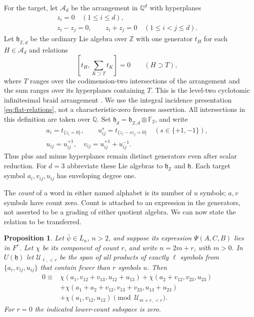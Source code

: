 \documentclass[11pt]{article}
\newcommand{\Q}{\mathbb Q}
\newcommand{\Z}{\mathbb Z}
\newcommand{\F}{{\mathbb F_2}}
\newtheorem{proposition}[theorem]{Proposition}
\theoremstyle{definition}
\theoremstyle{remark}
\numberwithin{equation}{section}
\begin{document}
For the target, let $\mathcal A_d$ be the arrangement in $\Q^d$ with
hyperplanes
\[
 \begin{gathered}
 z_i=0\quad(1\leq i\leq d),\\
 z_i-z_j=0,\qquad z_i+z_j=0\quad(1\leq i<j\leq d).
 \end{gathered}
\]
Let $\mathfrak h_{\Z,d}$ be the ordinary Lie algebra over $\Z$ with
one generator $t_H$ for each $H\in\mathcal A_d$ and relations
\begin{equation}\label{eq:flat-relations}
 \left[t_H,\sum_{K\supset T}t_K\right]=0
 \qquad(H\supset T),
\end{equation}
where $T$ ranges over the codimension-two intersections of the
arrangement and the sum ranges over its hyperplanes containing $T$.
This is the level-two cyclotomic infinitesimal braid arrangement
\cite[Section~1.4]{Enriquez}.  We use the integral incidence
presentation \eqref{eq:flat-relations}, not a characteristic-zero
freeness assertion.
All intersections in this definition are taken over $\Q$.
Set $\mathfrak h_d=\mathfrak h_{\Z,d}\otimes\F$, and write
\[
 \begin{gathered}
 a_i=t_{\{z_i=0\}},\qquad
 u_{ij}^s=t_{\{z_i-sz_j=0\}}\quad(s\in\{+1,-1\}),\\
 u_{ij}=u_{ij}^{+1},\quad v_{ij}=u_{ij}^{+1}+u_{ij}^{-1}.
 \end{gathered}
\]
Thus plus and minus hyperplanes remain distinct generators even after
scalar reduction.  For $d=3$ abbreviate these Lie algebras to
$\mathfrak h_\Z$ and $\mathfrak h$.  Each target symbol $a_i,v_{ij},u_{ij}$
has enveloping degree one.

The \emph{count} of a word in either named alphabet is its number of
$u$ symbols; $a,v$ symbols have count zero.  Count is attached to an
expression in the generators, not asserted to be a grading of either
quotient algebra.  We can now state the relation to be transferred.

\begin{proposition}\label{prop:leading-pentagon}
Let $\bar\psi\in\overline L_n$, $n>2$, and suppose its expression
$\Psi(A,C,B)$ lies in $F^r$.  Let $\chi$ be its component of count $r$,
and write $n=2m+r$, with $m>0$.  In $U(\mathfrak h)$ let
$\mathcal U_{\ell,<r}$ be the span of all products of exactly $\ell$
symbols from $\{a_i,v_{ij},u_{ij}\}$ that contain fewer than $r$
symbols $u$.  Then
\begin{equation}\label{eq:leading-pentagon}
\begin{split}
 0\equiv{}&\chi(a_1,v_{12}+v_{13},u_{12}+u_{13})
       +\chi(a_2+v_{12},v_{23},u_{23})\\
 &+\chi(a_1+a_2+v_{12},v_{13}+v_{23},u_{13}+u_{23})\\
 &+\chi(a_1,v_{12},u_{12})\pmod{\mathcal U_{m+r,<r}}.
\end{split}
\end{equation}
For $r=0$ the indicated lower-count subspace is zero.
\end{proposition}
\end{document}
